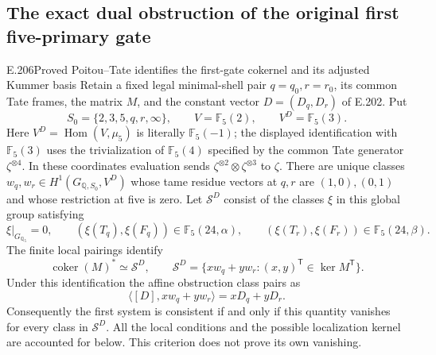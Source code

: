 \subsection{The exact dual obstruction of the original first five-primary gate}

\begin{result}{E.206}{Proved}
{Poitou--Tate identifies the first-gate cokernel and its adjusted Kummer basis}
Retain a fixed legal minimal-shell pair $q=q_0,r=r_0$, its common
Tate frames, the matrix $M$, and the constant vector $D=(D_q,D_r)$
of E.202.  Put
\[
 S_0=\{2,3,5,q,r,\infty\},\qquad
 V=\mathbb F_5(2),\qquad V^D=\mathbb F_5(3).
\]
Here $V^D=\operatorname{Hom}(V,\mu_5)$ is literally
$\mathbb F_5(-1)$; the displayed identification with
$\mathbb F_5(3)$ uses the trivialization of $\mathbb F_5(4)$
specified by the common Tate generator $\zeta^{\otimes4}$.
In these coordinates evaluation sends
$\zeta^{\otimes2}\otimes\zeta^{\otimes3}$ to $\zeta$.
There are unique classes $w_q,w_r\in H^1(G_{\mathbb Q,S_0},V^D)$
whose tame residue vectors at $q,r$ are $(1,0),(0,1)$ and whose
restriction at five is zero.  Let $\mathcal S^D$ consist of the
classes $\xi$ in this global group satisfying
\[
 \xi|_{G_{\mathbb Q_5}}=0,\qquad
 (\xi(T_q),\xi(F_q))\in\mathbb F_5(24,\alpha),\qquad
 (\xi(T_r),\xi(F_r))\in\mathbb F_5(24,\beta).
 \tag{E.206.1}
\]
The finite local pairings identify
\[
 \operatorname{coker}(M)^*\simeq\mathcal S^D,
 \qquad
 \mathcal S^D=\{xw_q+yw_r:(x,y)^{\mathsf T}\in\ker M^{\mathsf T}\}.
 \tag{E.206.2}
\]
Under this identification the affine obstruction class pairs as
\[
          \langle[D],xw_q+yw_r\rangle=xD_q+yD_r.
 \tag{E.206.3}
\]
Consequently the first system is consistent if and only if this
quantity vanishes for every class in $\mathcal S^D$.
All the local conditions and the possible localization kernel are
accounted for below.  This criterion does not prove its own vanishing.
\end{result}

